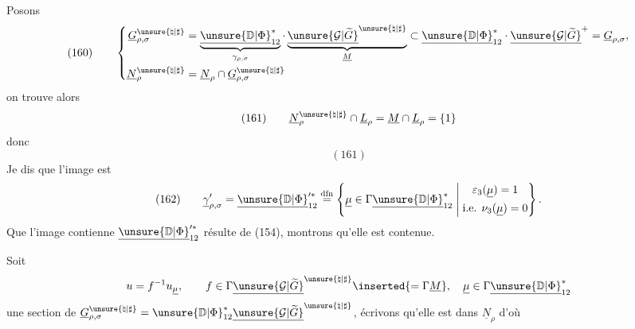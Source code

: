 Posons
\[
(160)\qquad\left\{
\begin{aligned}
\underline G_{\rho,\sigma}^{\unsure{\natural|\sharp}}
&=\underbrace{\underline{\unsure{\mathbb D|\Phi}}_{12}^{*}}_{\gamma_{\rho,\sigma}}\cdot
\underbrace{\underline{\unsure{\mathcal G|\widetilde G}}^{\unsure{\natural|\sharp}}}_{\underline M}
\subset\underline{\unsure{\mathbb D|\Phi}}_{12}^{*}\cdot\underline{\unsure{\mathcal G|\widetilde G}}^{+}
=\underline G_{\rho,\sigma},\\
\underline N_\rho^{\unsure{\natural|\sharp}}
&=\underline N_\rho\cap\underline G_{\rho,\sigma}^{\unsure{\natural|\sharp}}
\end{aligned}\right.
\]
on trouve alors
\[
(161)\qquad
\underline N_\rho^{\unsure{\natural|\sharp}}\cap\underline L_\rho
=\underline M\cap\underline L_\rho=\{1\}
\]
donc
\[
(161)
\]
Je dis que l'image est
\[
(162)\qquad
\underline\gamma'_{\rho,\sigma}
=\underline{\unsure{\mathbb D|\Phi}}_{12}^{\prime *}
\overset{\mathrm{dfn}}{=}
\left\{\underline\mu\in\Gamma\underline{\unsure{\mathbb D|\Phi}}_{12}^{*}\;\middle|\;
\begin{gathered}\varepsilon_3(\underline\mu)=1\\\text{i.e. }\nu_3(\underline\mu)=0\end{gathered}\right\}.
\]
Que l'image contienne $\underline{\unsure{\mathbb D|\Phi}}_{12}^{\prime *}$ résulte de (154), montrons qu'elle est contenue.

Soit
\[
u=f^{-1}u_{\underline\mu},\qquad
f\in\Gamma\underline{\unsure{\mathcal G|\widetilde G}}^{\unsure{\natural|\sharp}}\inserted{=\Gamma\underline M},\quad
\underline\mu\in\Gamma\underline{\unsure{\mathbb D|\Phi}}_{12}^{*}
\]
une section  de
$\underline G_{\rho,\sigma}^{\unsure{\natural|\sharp}}
=\unsure{\mathbb D|\Phi}_{12}^{*}\underline{\unsure{\mathcal G|\widetilde G}}^{\unsure{\natural|\sharp}}$,
écrivons qu'elle est dans $\underline N_\rho$ d'où


